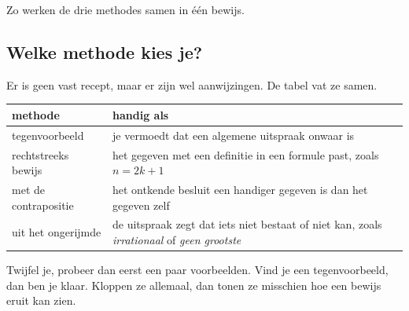Zo werken de drie methodes samen in één bewijs.

\subsection{Welke methode kies je?}

Er is geen vast recept, maar er zijn wel aanwijzingen. De tabel vat ze samen.

\begin{center}
{\renewcommand{\arraystretch}{1.3}%
\begin{tabular}{|>{\RaggedRight\arraybackslash}p{3.9cm}|>{\RaggedRight\arraybackslash}p{9.6cm}|}
\hline
\rowcolor{accent!10}\textbf{methode} & \textbf{handig als} \\ \hline
tegenvoorbeeld & je vermoedt dat een algemene uitspraak onwaar is \\ \hline
rechtstreeks bewijs & het gegeven met een definitie in een formule past, zoals $n = 2k + 1$ \\ \hline
met de contrapositie & het ontkende besluit een handiger gegeven is dan het gegeven zelf \\ \hline
uit het ongerijmde & de uitspraak zegt dat iets niet bestaat of niet kan, zoals \textit{irrationaal} of \textit{geen grootste} \\ \hline
\end{tabular}}
\end{center}

Twijfel je, probeer dan eerst een paar voorbeelden. Vind je een tegenvoorbeeld, dan ben je klaar. Kloppen ze allemaal, dan tonen ze misschien hoe een bewijs eruit kan zien.

\opdrachtenkop

\begin{oefeningen}




















\end{oefeningen}

